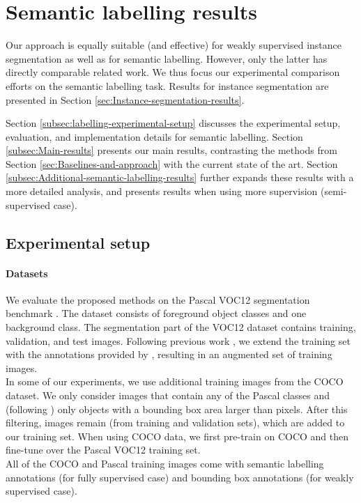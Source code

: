 \documentclass[10pt,english,british,twocolumn]{article}
\begin{document}
\section{\label{sec:Semantic-labelling-results}Semantic labelling results}

Our approach is equally suitable (and effective) for weakly supervised
instance segmentation as well as for semantic labelling. However,
only the latter has directly comparable related work. We thus focus
our experimental comparison efforts on the semantic labelling task.
Results for instance segmentation are presented in Section \ref{sec:Instance-segmentation-results}.

Section \ref{subsec:labelling-experimental-setup} discusses the experimental
setup, evaluation, and implementation details for semantic labelling.
Section \ref{subsec:Main-results} presents our main results, contrasting
the methods from Section \ref{sec:Baselines-and-approach} with the
current state of the art. Section \ref{subsec:Additional-semantic-labelling-results}
further expands these results with a more detailed analysis, and presents
results when using more supervision (semi-supervised case).

\subsection{\label{subsec:labelling-experimental-setup}Experimental setup}

\paragraph{Datasets}

We evaluate the proposed methods on the Pascal VOC12 segmentation
benchmark \cite{Everingham15}. The dataset consists of  foreground
object classes and one background class. The segmentation part of
the VOC12 dataset contains  training,  validation,
and  test images. Following previous work \cite{Chen2015Iclr,Dai2015Iccv},
we extend the training set with the annotations provided by \cite{Hariharan2011Iccv},
resulting in an augmented set of  training images.\\
In some of our experiments, we use additional training images from
the COCO \cite{Lin2014EccvCoco} dataset. We only consider images
that contain any of the  Pascal classes and (following \cite{Zheng2015IccvCrfAsRnn})
only objects with a bounding box area larger than  pixels. After
this filtering,  images remain (from training and validation
sets), which are added to our training set. When using COCO data,
we first pre-train on COCO and then fine-tune over the Pascal VOC12
training set.\\
All of the COCO and Pascal training images come with semantic labelling
annotations (for fully supervised case) and bounding box annotations
(for weakly supervised case).
\end{document}
